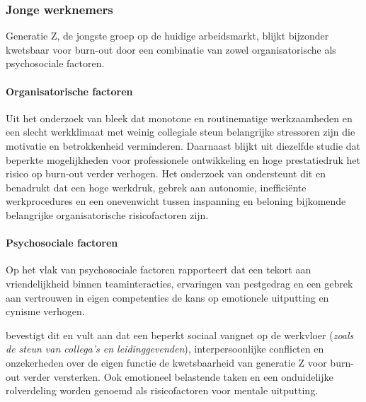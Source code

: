 \subsubsection{Jonge werknemers}
\label{subsubsec:jonge-werknemers}

\vspace{1em}

Generatie Z, de jongste groep op de huidige arbeidsmarkt, blijkt bijzonder kwetsbaar voor burn-out door een combinatie van zowel organisatorische als psychosociale factoren.

\vspace{1em}

\paragraph{Organisatorische factoren}

\vspace{1em}

Uit het onderzoek van \textcite{KowalczykKroenke2026} bleek dat monotone en routinematige werkzaamheden en een slecht werkklimaat met weinig collegiale steun belangrijke stressoren zijn die motivatie en betrokkenheid verminderen. Daarnaast blijkt uit diezelfde studie dat beperkte mogelijkheden voor professionele ontwikkeling en hoge prestatiedruk het risico op burn-out verder verhogen. Het onderzoek van \textcite{Veen2022} ondersteunt dit en benadrukt dat een hoge werkdruk, gebrek aan autonomie, inefficiënte werkprocedures en een onevenwicht tussen inspanning en beloning bijkomende belangrijke organisatorische risicofactoren zijn.

\vspace{1em}

\paragraph{Psychosociale factoren}

\vspace{1em}

Op het vlak van psychosociale factoren rapporteert \textcite{KowalczykKroenke2026} dat een tekort aan vriendelijkheid binnen teaminteracties, ervaringen van pestgedrag en een gebrek aan vertrouwen in eigen competenties de kans op emotionele uitputting en cynisme verhogen. 

\vspace{1em}

\textcite{Veen2022} bevestigt dit en vult aan dat een beperkt sociaal vangnet op de werkvloer (\textit{zoals de steun van collega’s en leidinggevenden}), interpersoonlijke conflicten en onzekerheden over de eigen functie de kwetsbaarheid van generatie Z voor burn-out verder versterken. Ook emotioneel belastende taken en een onduidelijke rolverdeling worden genoemd als risicofactoren voor mentale uitputting.

